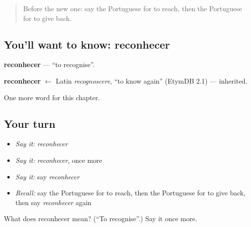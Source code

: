 \label{lesson:PT-C143-reconhecer}



\begin{quote}
Before the new one: say the Portuguese for to reach, then the Portuguese for to give back.
\end{quote}

\subsection*{You'll want to know: reconhecer}
\textbf{reconhecer} — \textquotedblleft{}to recognise\textquotedblright{}.

\begin{cousinweb}
\textbf{reconhecer} $\leftarrow$ Latin \emph{recognoscere}, \textquotedblleft{}to know again\textquotedblright{} (EtymDB 2.1) — inherited.
\end{cousinweb}

\begin{grammarlens}[title={What you've built}]
One more word for this chapter.
\end{grammarlens}

\subsection*{Your turn}
\begin{itemize}
\raggedright
  \item \emph{Say it:} \emph{reconhecer}
  \item \emph{Say it:} \emph{reconhecer}, once more
  \item \emph{Say it:} say \emph{reconhecer}
  \item \emph{Recall:} say the Portuguese for to reach, then the Portuguese for to give back, then say \emph{reconhecer} again
\end{itemize}

\begin{tcolorbox}[breakable,colback=teal!4,colframe=teal!35!black,title={Before you move on}]
What does reconhecer mean? (\textquotedblleft{}To recognise\textquotedblright{}.) Say it once more.
\end{tcolorbox}
